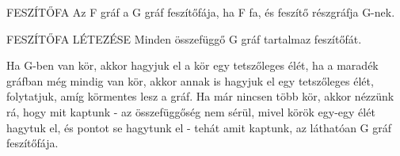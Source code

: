 \begin{definicio}{FESZÍTŐFA}
Az F gráf a G gráf feszítőfája, ha F fa, és feszítő részgráfja G-nek.
\end{definicio}

\begin{tetel}{FESZÍTŐFA LÉTEZÉSE}
Minden összefüggő G gráf tartalmaz feszítőfát.
\end{tetel}

\begin{bizonyitas}{}
Ha G-ben van kör, akkor hagyjuk el a kör egy tetszőleges élét, ha a maradék gráfban még mindig van kör, akkor annak is hagyjuk el egy tetszőleges élét, folytatjuk, amíg körmentes lesz a gráf. Ha már nincsen több kör, akkor nézzünk rá, hogy mit kaptunk - az összefüggőség nem sérül, mivel körök egy-egy élét hagytuk el, és pontot se hagytunk el - tehát amit kaptunk, az láthatóan G gráf feszítőfája.
\end{bizonyitas}
